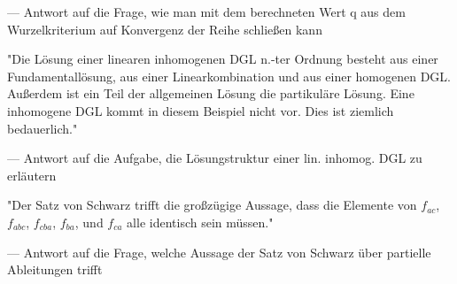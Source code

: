 --- Antwort auf die Frage, wie man mit dem berechneten Wert q aus dem Wurzelkriterium auf Konvergenz der Reihe schließen kann


\begin{displayquote}
	"Die Lösung einer linearen inhomogenen DGL n.-ter Ordnung besteht aus einer Fundamentallösung, aus einer Linearkombination und aus einer homogenen DGL. Außerdem ist ein Teil der allgemeinen Lösung die partikuläre Lösung. Eine inhomogene DGL kommt in diesem Beispiel nicht vor. Dies ist ziemlich bedauerlich."
\end{displayquote}

--- Antwort auf die Aufgabe, die Lösungstruktur einer lin. inhomog. DGL zu erläutern


\begin{displayquote}
	"Der Satz von Schwarz trifft die großzügige Aussage, dass die Elemente von $f_{ac}$, $f_{abc}$, $f_{cba}$, $f_{ba}$, und $f_{ca}$ alle identisch sein müssen."
\end{displayquote}

--- Antwort auf die Frage, welche Aussage der Satz von Schwarz über partielle Ableitungen trifft

